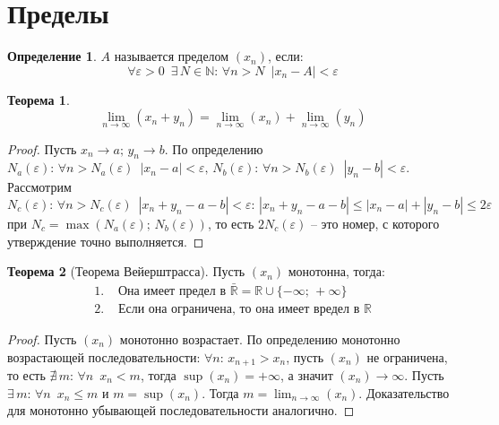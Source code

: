 \documentclass[12pt]{article}
\theoremstyle{definition}
\newtheorem{theorem}{Теорема}[section]
\newtheorem{definition}{Определение}
\newcommand{\N}{\mathbb{N}}
\newcommand{\R}{\mathbb{R}}
\begin{document}
\section{Пределы}
\begin{definition}
    $A$ называется пределом $(x_n)$, если:
    $$\forall \varepsilon >0\,\,\,\exists\,N\in\N:\,\forall n>N\,\,\,|x_n-A|<\varepsilon$$
\end{definition}
\begin{theorem}
    $$\lim_{n\to\infty}(x_n+y_n)=\lim_{n\to\infty}(x_n)+\lim_{n\to\infty}(y_n)$$
\end{theorem}
\begin{proof}
    Пусть $x_n\to a;\,y_n\to b$. По определению $N_a(\varepsilon):\,\forall n>N_a(\varepsilon)\,\,\,|x_n-a|<\varepsilon,\,N_b(\varepsilon):\,\forall n>N_b(\varepsilon)\,\,\,|y_n-b|<\varepsilon$. Рассмотрим $N_c(\varepsilon):\,\forall n>N_c(\varepsilon)\,\,\,|x_n+y_n-a-b|<\varepsilon:\,|x_n+y_n-a-b|\leq|x_n-a|+|y_n-b|\leq 2\varepsilon$ при $N_c=\max(N_a(\varepsilon);\,N_b(\varepsilon))$, то есть $2N_c(\varepsilon)$ -- это номер, с которого утверждение точно выполняется.
\end{proof}
\begin{theorem}[Теорема Вейерштрасса]
    Пусть $(x_n)$ монотонна, тогда:
    \begin{align*}
        1.\,\,&\text{Она имеет предел в }\bar{\R}=\R\cup\{-\infty;\,+\infty\}\\
        2.\,\,&\text{Если она ограничена, то она имеет вредел в }\R
    \end{align*}
\end{theorem}
\begin{proof}
    Пусть $(x_n)$ монотонно возрастает. По определению монотонно возрастающей последовательности: $\forall n:\, x_{n+1}>x_n$, пусть $(x_n)$ не ограничена, то есть $\nexists\,m:\,\forall n\,\,\,x_n<m$, тогда $\sup(x_n)=+\infty$, а значит $(x_n)\to \infty$. Пусть $\exists\,m:\,\forall n \,\,\,x_n\leq m$ и $m=\sup(x_n)$. Тогда $m=\lim_{n\to\infty}(x_n)$. Доказательство для монотонно убывающей последовательности аналогично.
\end{proof}
\end{document}
